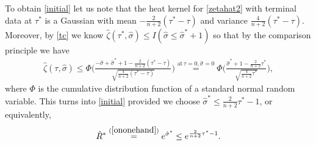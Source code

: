 \documentclass[english, letterpaper,12pt,reqno]{amsart}
\theoremstyle{remark}
\theoremstyle{plain}
\newcommand{\1}{\mathbf{1}}
\begin{document}
\medskip
\noindent
To obtain \eqref{initial} let us note that the heat kernel for \eqref{zetahat2} with terminal data at $ \tau^*$ is a Gaussian with mean $- \frac{ 2 }{ n + 2 } ( \tau^*- \tau) $ and variance $ \frac{ 4 }{ n + 2 } ( \tau^* - \tau ) $. Moreover, by \eqref{tc} we know $\hat{\zeta}( \tau^*,\hat{\sigma}) \leq I(\hat{\sigma}\leq \hat{\sigma}^*+1)$ so that by the comparison principle we have
%
\begin{align*}
    \hat{\zeta}(\tau,\hat{\sigma}) \leq \Phi \Big( \frac{-\hat{\sigma}+\hat{\sigma}^*+1 - \frac{ 2 }{ n + 2 } ( \tau^*- \tau)}{\sqrt{ \frac{ 4 }{ n + 2 } ( \tau^*-\tau ) } } \Big)
    \stackrel{\text{at}\, \tau = 0,  \hat{\sigma} = 0 }{ = }\Phi \Big(\frac{\hat{\sigma}^*+1- \frac{ 2 }{ n + 2 } \tau^* }{\sqrt{ \frac{ 4 }{ n + 2 } \tau^*}} \Big) ,
\end{align*}
%
where $\Phi$ is the cumulative distribution function of a standard normal random variable. This turns into \eqref{initial} provided we choose $ \hat{\sigma}^* \leq \frac{ 2 }{ n + 2 } \tau^*- 1 $, or equivalently,
%
\begin{align}\label{eqnHatRStar}
	\hat{R}^*
	\stackrel{ (\ref{ononehand}) }{ = } e^{ \hat \sigma^* }
	\leq e^{ \frac{ 2 }{ n + 2 } \tau^*-1} .
\end{align}
%

\medskip
\end{document}

